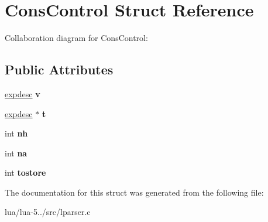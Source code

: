 \hypertarget{struct_cons_control}{\section{Cons\+Control Struct Reference}
\label{struct_cons_control}
}


Collaboration diagram for Cons\+Control\+:
\subsection*{Public Attributes}
\begin{DoxyCompactItemize}
\item 
\hypertarget{struct_cons_control_a870b3f1c8296439dc09993d20d9f6caa}{\hyperlink{structexpdesc}{expdesc} {\bfseries v}}\label{struct_cons_control_a870b3f1c8296439dc09993d20d9f6caa}

\item 
\hypertarget{struct_cons_control_a48957892a93373c54f7baf9676f77587}{\hyperlink{structexpdesc}{expdesc} $\ast$ {\bfseries t}}\label{struct_cons_control_a48957892a93373c54f7baf9676f77587}

\item 
\hypertarget{struct_cons_control_a852370c0a8dc4a0ca21756191f170ac5}{int {\bfseries nh}}\label{struct_cons_control_a852370c0a8dc4a0ca21756191f170ac5}

\item 
\hypertarget{struct_cons_control_abb136d2c320d052e5a7dd5518f490c11}{int {\bfseries na}}\label{struct_cons_control_abb136d2c320d052e5a7dd5518f490c11}

\item 
\hypertarget{struct_cons_control_a27afc7c4e0be2751c3c2c981a94f1948}{int {\bfseries tostore}}\label{struct_cons_control_a27afc7c4e0be2751c3c2c981a94f1948}

\end{DoxyCompactItemize}


The documentation for this struct was generated from the following file\+:\begin{DoxyCompactItemize}
\item 
lua/lua-\/5../src/lparser.\+c\end{DoxyCompactItemize}
